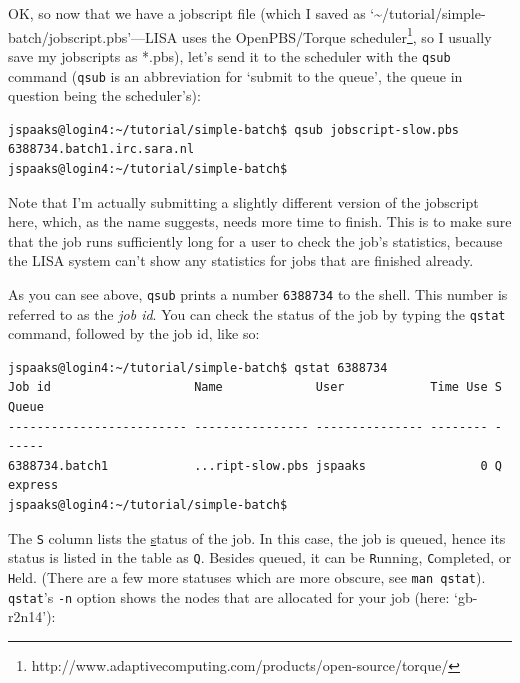 OK, so now that we have a jobscript file (which I saved as `\textasciitilde{}/tutorial/simple-batch/jobscript.pbs'---LISA uses the OpenPBS/Torque scheduler\footnote{http://www.adaptivecomputing.com/products/open-source/torque/}, so I usually save my jobscripts as *.pbs), let's send it to the scheduler with the \lstinline[style=bashinline]{qsub} command (\lstinline[style=bashinline]{qsub} is an abbreviation for `submit to the queue', the queue in question being the scheduler's):
\begin{lstlisting}[style=basic,style=bash]
jspaaks@login4:~/tutorial/simple-batch$ qsub jobscript-slow.pbs
6388734.batch1.irc.sara.nl
jspaaks@login4:~/tutorial/simple-batch$ 
\end{lstlisting}
Note that I'm actually submitting a slightly different version of the jobscript here, which, as the name suggests, needs more time to finish. This is to make sure that the job runs sufficiently long for a user to check the job's statistics, because the LISA system can't show any statistics for jobs that are finished already.

As you can see above, \lstinline[style=bashinline]{qsub} prints a number \lstinline[style=bashinline]{6388734} to the shell. This number is referred to as the \textit{job id}.
You can check the status of the job by typing the \lstinline[style=bashinline]{qstat} command, followed by the job id, like so:
\begin{lstlisting}[style=basic,style=bash]
jspaaks@login4:~/tutorial/simple-batch$ qstat 6388734
Job id                    Name             User            Time Use S Queue
------------------------- ---------------- --------------- -------- - -----
6388734.batch1            ...ript-slow.pbs jspaaks                0 Q express        
jspaaks@login4:~/tutorial/simple-batch$ 
\end{lstlisting}
The \lstinline[style=bashinline]{S} column lists the \underline{s}tatus of the job. In this case, the job is queued, hence its status is listed in the table as \lstinline[style=bashinline]{Q}. Besides queued, it can be \lstinline[style=bashinline]{R}unning, \lstinline[style=bashinline]{C}ompleted, or \lstinline[style=bashinline]{H}eld. (There are a few more statuses which are more obscure, see \lstinline[style=bashinline]{man qstat}). \lstinline[style=bashinline]{qstat}'s \lstinline[style=bashinline]{-n} option shows the nodes that are allocated for your job (here: `gb-r2n14'):%

